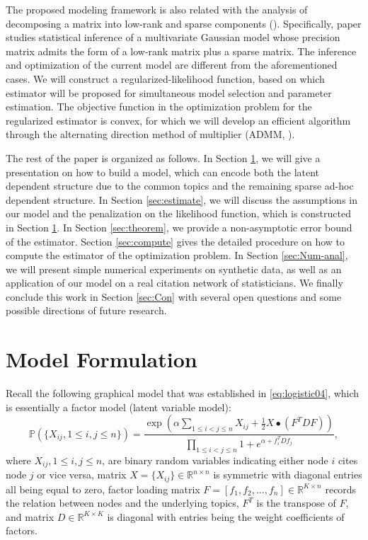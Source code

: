 \documentclass[AMS,STIX1COL]{WileyNJD-v2}
\begin{document}
{The proposed modeling framework is also related with the analysis of decomposing a matrix into low-rank and sparse components (\cite{agarwal2012noisy,candes2011robust,chandrasekaran2010latent, zhou2010stable}).
Specifically, paper \cite{chandrasekaran2010latent} studies statistical inference of a multivariate Gaussian model whose precision matrix admits the form of a low-rank matrix plus a sparse matrix.
The inference and optimization of the current model are different from the aforementioned cases.
We will construct a regularized-likelihood function, based on which estimator will be proposed for simultaneous model selection and parameter estimation.
The objective function in the optimization problem for the regularized estimator is convex, for which we will develop an efficient algorithm through the alternating direction method of multiplier (ADMM, \cite{boyd2011distributed, gabay1975dual, glowinski1975solution}).

The rest of the paper is organized as follows.
In Section \ref{sec:model-form}, we will give a presentation on how to build a model, which can encode both the latent dependent structure due to the common topics and the remaining sparse ad-hoc dependent structure.
In Section \ref{sec:estimate}, we will discuss the assumptions in our model and the penalization on the likelihood function, which is constructed in Section \ref{sec:model-form}.
In Section \ref{sec:theorem}, we provide a non-asymptotic error bound of the estimator.
Section \ref{sec:compute} gives the detailed procedure on how to compute the estimator of the optimization problem.
In Section \ref{sec:Num-anal}, we will present simple numerical experiments on synthetic data, as well as an application of our model on a real citation network of statisticians.
We finally conclude this work in Section \ref{sec:Con} with several open questions and some possible directions of future research.

\section{Model Formulation}
\label{sec:model-form}

Recall the following graphical model that was established in \eqref{eq:logistic04}, which is essentially a factor model (latent variable model):
$$
\mathbb{P}\left(\{X_{ij}, 1\le i,j \le n\}\right)
= \frac{\exp\left(\alpha \sum_{1\le i< j\le n}X_{ij} +\frac{1}{2} X \bullet (F^T D F)\right)}{\prod_{1\le i<j \le n}  1 + e^{\alpha + f_i^T D f_j }},
$$
where
$X_{ij}, 1\le i,j \le n$, are binary random variables indicating either node $i$ cites node $j$ or vice versa,
matrix $X = \{X_{ij}\} \in \mathbb{R}^{n \times n}$ is symmetric with diagonal entries all being equal to zero,
factor loading matrix $F = [f_1,f_2,\ldots,f_n]\in \mathbb{R}^{K\times n}$ records the relation between nodes and the underlying topics, $F^T$ is the transpose of $F$,
and matrix $D \in \mathbb{R}^{K \times K}$  is diagonal with entries being the weight coefficients of factors.

}
\end{document}

